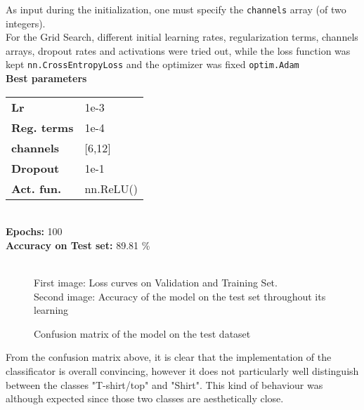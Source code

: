 \documentclass[11pt,a4paper,twocolumn]{IEEEtran}
\newcommand{\thinsepline}{\noindent\makebox[\linewidth]{\rule{7.5cm}{0.02pt}}}
\newcommand{\thinnersepline}{\noindent\makebox[\linewidth]{\rule{7.5cm}{0.01pt}}}
\begin{document}
			As input during the initialization, one must specify the \texttt{channels} array (of two integers).\medskip\\
			For the Grid Search, different initial learning rates, regularization terms, channels arrays, dropout rates and activations were tried out, while the loss function was kept \texttt{nn.CrossEntropyLoss} and the optimizer was fixed \texttt{optim.Adam}
			\thinsepline\\
			\textbf{Best parameters}\medskip\\
			\begin{tabular}{ll}
				\textbf{Lr}	& 1e-3 \\
				\textbf{Reg. terms}	& 1e-4 \\
				\textbf{channels} & [6,12] \\
				\textbf{Dropout} & 1e-1 \\
				\textbf{Act. fun.} & nn.ReLU() \\
			\end{tabular}
			\thinnersepline\\
			\textbf{Epochs:} 100\\
			\textbf{Accuracy on Test set:} 89.81 \%\vspace*{-.2cm}\\
			\thinsepline\vspace*{-.7cm}\\
			\newpage
			\begin{figure}[h]
				\centering
				
				\caption{First image: Loss curves on Validation and Training Set.\\ Second image: Accuracy of the model on the test set throughout its learning}
			\end{figure}
			\begin{figure}[h]
				\centering
				
				\caption{Confusion matrix of the model on the test dataset}
			\end{figure}
			From the confusion matrix above, it is clear that the implementation of the classificator is overall convincing, however it does not particularly well distinguish between the classes "T-shirt/top" and "Shirt". This kind of behaviour was although expected since those two classes are aesthetically close.
\end{document}
